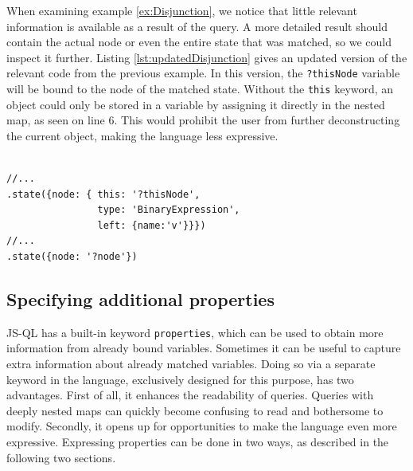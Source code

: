 \begin{exmp}
\label{ex:This}
When examining example \ref{ex:Disjunction}, we notice that little relevant information is available as a result of the query. A more detailed result should contain the actual node or even the entire state that was matched, so we could inspect it further. Listing \ref{lst:updatedDisjunction} gives an updated version of the relevant code from the previous example. In this version, the \texttt{?thisNode} variable will be bound to the node of the matched state. Without the \texttt{this} keyword, an object could only be stored in a variable by assigning it directly in the nested map, as seen on line 6. This would prohibit the user from further deconstructing the current object, making the language less expressive.

\begin{lstlisting}[label={lst:updatedDisjunction},language=JSQL,caption=Using the \texttt{this} keyword,mathescape=true]  % float=t?

//...
.state({node: { this: '?thisNode',
                type: 'BinaryExpression',
                left: {name:'v'}}})     
//... 
.state({node: '?node'})
\end{lstlisting}

\end{exmp}

\subsection{Specifying additional properties}
\label{subsec:props}

JS-QL has a built-in keyword \texttt{properties}, which can be used to obtain more information from already bound variables. 
Sometimes it can be useful to capture extra information about already matched variables. Doing so via a separate keyword in the language, exclusively designed for this purpose, has two advantages. First of all, it enhances the readability of queries. Queries with deeply nested maps can quickly become confusing to read and bothersome to modify. Secondly, it opens up for opportunities to make the language even more expressive. Expressing properties can be done in two ways, as described in the following two sections.


